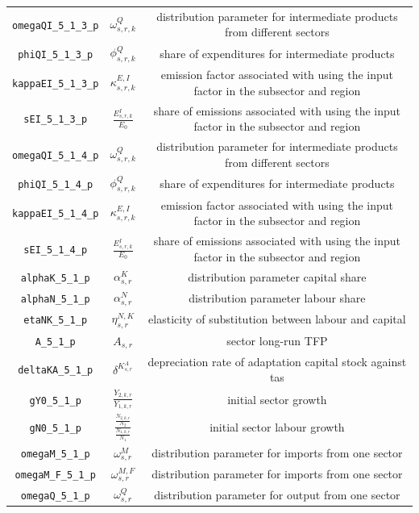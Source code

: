 \begin{center}
\begin{longtable}{ccc}
\texttt{omegaQI\_5\_1\_3\_p} & ${\omega^{Q}_{s,r,k}}$ & distribution parameter for intermediate products from different sectors\\
\texttt{phiQI\_5\_1\_3\_p} & ${\phi^{Q}_{s,r,k}}$ & share of expenditures for intermediate products\\
\texttt{kappaEI\_5\_1\_3\_p} & ${\kappa^{E,I}_{s,r,k}}$ & emission factor associated with using the input factor in the subsector and region\\
\texttt{sEI\_5\_1\_3\_p} & ${\frac{E^{I}_{s,r,k}}{E_0}}$ & share of emissions associated with using the input factor in the subsector and region\\
\texttt{omegaQI\_5\_1\_4\_p} & ${\omega^{Q}_{s,r,k}}$ & distribution parameter for intermediate products from different sectors\\
\texttt{phiQI\_5\_1\_4\_p} & ${\phi^{Q}_{s,r,k}}$ & share of expenditures for intermediate products\\
\texttt{kappaEI\_5\_1\_4\_p} & ${\kappa^{E,I}_{s,r,k}}$ & emission factor associated with using the input factor in the subsector and region\\
\texttt{sEI\_5\_1\_4\_p} & ${\frac{E^{I}_{s,r,k}}{E_0}}$ & share of emissions associated with using the input factor in the subsector and region\\
\texttt{alphaK\_5\_1\_p} & ${\alpha^{K}_{s,r}}$ & distribution parameter capital share\\
\texttt{alphaN\_5\_1\_p} & ${\alpha^{N}_{s,r}}$ & distribution parameter labour share\\
\texttt{etaNK\_5\_1\_p} & ${\eta^{N,K}_{s,r}}$ & elasticity of substitution between labour and capital\\
\texttt{A\_5\_1\_p} & ${A_{s,r}}$ & sector long-run TFP\\
\texttt{deltaKA\_5\_1\_p} & ${\delta^{K^{A}_{s,r}}}$ & depreciation rate of adaptation capital stock against tas\\
\texttt{gY0\_5\_1\_p} & ${\frac{Y_{2,k,r}}{Y_{1,k,r}}}$ & initial sector growth\\
\texttt{gN0\_5\_1\_p} & ${\frac{\frac{N_{2,k,r}}{N_{2}}}{\frac{N_{1,k,r}}{N_{1}}}}$ & initial sector labour growth\\
\texttt{omegaM\_5\_1\_p} & ${\omega^{M}_{s,r}}$ & distribution parameter for imports from one sector\\
\texttt{omegaM\_F\_5\_1\_p} & ${\omega^{M,F}_{s,r}}$ & distribution parameter for imports from one sector\\
\texttt{omegaQ\_5\_1\_p} & ${\omega^{Q}_{s,r}}$ & distribution parameter for output from one sector\\

\end{longtable}
\end{center}
